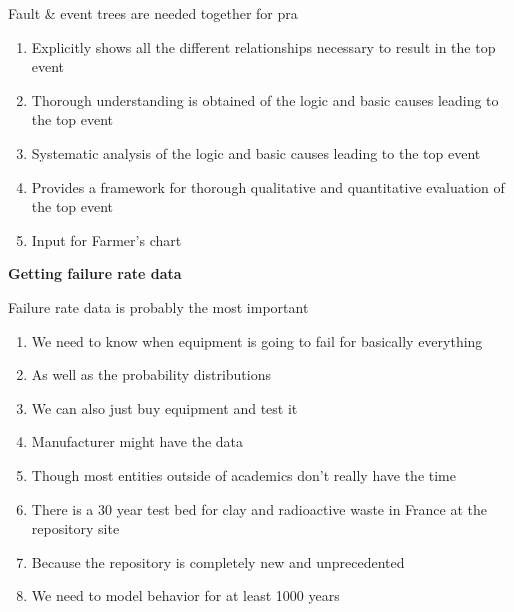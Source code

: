 \documentclass[aspectratio=1610,pdftex,dvipsnames,compress,xcolor={dvipsnames}]{beamer}
\newcommand{\acs}{\acrshort} %
\begin{document}
\begin{frame}{Fault \& event trees are needed together for \acs{pra}}
    \begin{enumerate}[series=outerlist,topsep=0pt,itemsep=21pt,leftmargin=*,label=(\arabic*)]
        \item[]Explicitly shows all the different relationships necessary to result in the top event
        \item[]Thorough understanding is obtained of the logic and basic causes leading to the top event
        \item[]Systematic analysis of the logic and basic causes leading to the top event
        \item[]Provides a framework for thorough qualitative and quantitative evaluation of the top event
        \item[]Input for Farmer's chart
    \end{enumerate}
\end{frame}


\begin{frame}[plain]{}
    \centering\LARGE\textbf{Getting failure rate data}
\end{frame}


\addtocounter{framenumber}{-1}
\begin{frame}{Failure rate data is probably the most important}
    \begin{enumerate}[series=outerlist,topsep=0pt,itemsep=7pt,leftmargin=*,label=(\arabic*)]
        \item[]We need to know when equipment is going to fail for basically everything
        \item[]As well as the probability distributions  
        \item[]We can also just buy equipment and test it  
        \item[]Manufacturer might have the data
        \item[]Though most entities outside of academics don't really have the time
        \item[]There is a 30 year test bed for clay and radioactive waste in France at the repository site 
        \item[]Because the repository is completely new and unprecedented 
        \item[]We need to model behavior for at least 1000 years
    \end{enumerate}
\end{frame}
\end{document}
